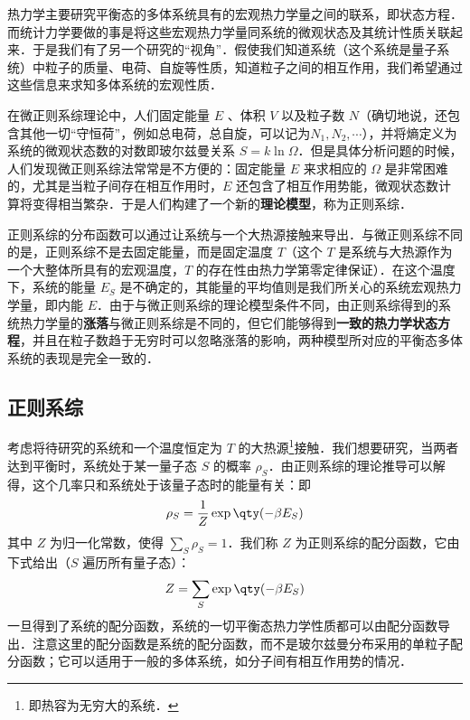 
\begin{issues}
\issueDraft
\end{issues}

热力学主要研究平衡态的多体系统具有的宏观热力学量之间的联系，即状态方程．而统计力学要做的事是将这些宏观热力学量同系统的微观状态及其统计性质关联起来．于是我们有了另一个研究的“视角”．假使我们知道系统（这个系统是量子系统）中粒子的质量、电荷、自旋等性质，知道粒子之间的相互作用，我们希望通过这些信息来求知多体系统的宏观性质．

在微正则系综理论中，人们固定能量 $E$ 、体积 $V$ 以及粒子数 $N$（确切地说，还包含其他一切“守恒荷”，例如总电荷，总自旋，可以记为$N_1,N_2,\cdots$），并将熵定义为系统的微观状态数的对数即玻尔兹曼关系 $S=k\ln \Omega$．但是具体分析问题的时候，人们发现微正则系综法常常是不方便的：固定能量 $E$ 来求相应的 $\Omega$ 是非常困难的，尤其是当粒子间存在相互作用时，$E$ 还包含了相互作用势能，微观状态数计算将变得相当繁杂．于是人们构建了一个新的\textbf{理论模型}，称为正则系综．

正则系综的分布函数可以通过让系统与一个大热源接触来导出．与微正则系综不同的是，正则系综不是去固定能量，而是固定温度 $T$（这个 $T$ 是系统与大热源作为一个大整体所具有的宏观温度，$T$ 的存在性由热力学第零定律保证）．在这个温度下，系统的能量 $E_S$ 是不确定的，其能量的平均值则是我们所关心的系统宏观热力学量，即内能 $E$．由于与微正则系综的理论模型条件不同，由正则系综得到的系统热力学量的\textbf{涨落}与微正则系综是不同的，但它们能够得到\textbf{一致的热力学状态方程}，并且在粒子数趋于无穷时可以忽略涨落的影响，两种模型所对应的平衡态多体系统的表现是完全一致的．
\subsection{正则系综}
考虑将待研究的系统和一个温度恒定为 $T$ 的大热源\footnote{即热容为无穷大的系统．}接触．我们想要研究，当两者达到平衡时，系统处于某一量子态 $S$ 的概率 $\rho_S$．由正则系综的理论推导可以解得，这个几率只和系统处于该量子态时的能量有关：即
\begin{equation}\label{CEsb_eq1}
\rho_S=\frac{1}{Z}\exp\qty(-\beta E_S)
\end{equation}
其中 $Z$ 为归一化常数，使得 $\sum_S \rho_S=1$．我们称 $Z$ 为正则系综的配分函数，它由下式给出（$S$ 遍历所有量子态）：
\begin{equation}
Z=\sum_S \exp\qty(-\beta E_S)
\end{equation}
一旦得到了系统的配分函数，系统的一切平衡态热力学性质都可以由配分函数导出．注意这里的配分函数是系统的配分函数，而不是玻尔兹曼分布采用的单粒子配分函数；它可以适用于一般的多体系统，如分子间有相互作用势的情况．

